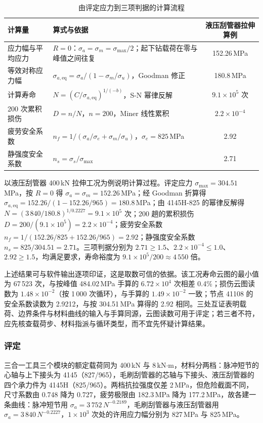 \begin{table}[htbp]
\centering
\caption{由评定应力到三项判据的计算流程}
\label{tab:fatigue-chain}
\small
\begin{tabularx}{\textwidth}{@{}lXc@{}}
\hline
计算量 & 算式与依据 & 液压刮管器拉伸算例 \\
\hline
应力幅与平均应力 & $R=0$：$\sigma_a=\sigma_m=\sigma_{\max}/2$；起下钻载荷在零与峰值之间往复 & 152.26\,MPa \\
等效对称应力幅 & $\sigma_{a,\mathrm{eq}}=\sigma_a/(1-\sigma_m/\sigma_u)$，Goodman 修正 & 180.8\,MPa \\
计算寿命 & $N=(C/\sigma_{a,\mathrm{eq}})^{1/(-b)}$，S-N 幂律反解 & $9.1\times10^{5}$ 次 \\
200 次累积损伤 & $D=n/N$，$n=200$，Miner 线性累积 & $2.2\times10^{-4}$ \\
疲劳安全系数 & $n_f=1/(\sigma_a/\sigma_e+\sigma_m/\sigma_u)$，$\sigma_e=825$\,MPa & 2.92 \\
静强度安全系数 & $n_s=\sigma_s/\sigma_{\max}$ & 2.71 \\
\hline
\end{tabularx}
\end{table}

以液压刮管器 400\,kN 拉伸工况为例说明计算过程。评定应力 $\sigma_{\max}=304.51$\,MPa，按 $R=0$ 得 $\sigma_a=\sigma_m=152.26$\,MPa；经 Goodman 折算得 $\sigma_{a,\mathrm{eq}}=152.26/(1-152.26/965)=180.8$\,MPa；由 4145H-825 的幂律反解得 $N=(3\,840/180.8)^{1/0.2227}=9.1\times10^{5}$ 次；200 趟的累积损伤 $D=200/(9.1\times10^{5})=2.2\times10^{-4}$；疲劳安全系数 $n_f=1/(152.26/825+152.26/965)=2.92$；静强度安全系数 $n_s=825/304.51=2.71$。三项判据分别为 $2.71\ge1.5$、$2.2\times10^{-4}\le1.0$、$2.92\ge1.5$，均满足要求，寿命裕度为 $9.1\times10^{5}/200\approx4\,550$ 倍。

上述结果可与软件输出逐项印证，这是取数可信的依据。该工况寿命云图的最小值为 67\,523 次，与按峰值 484.02\,MPa 手算的 $6.72\times10^{4}$ 次相差 0.4\%；损伤云图读数为 $1.48\times10^{-2}$（按 1\,000 次循环），与手算的 $1.49\times10^{-2}$ 一致；节点 41108 的安全系数读数为 2.9212，与按 304.51\,MPa 算得的 2.92 相同。三处互证表明载荷、边界条件与材料曲线的输入与手算同源，云图读数可用于评定；若三者不符，应先核查载荷步、材料指派与循环类型，而不宜先怀疑计算结果。

\subsubsection{评定}

三合一工具三个模块的额定载荷同为 400\,kN 与 8\,kN$\cdot$m，材料分两档：脉冲短节的心轴与上下接头为 4145（827/965），毛刷刮管器的芯轴与下接头、液压刮管器的四个承力件为 4145H（825/965）。两档抗拉强度仅差 2\,MPa，但危险截面不同，尺寸系数由 0.748 降为 0.727，疲劳极限由 182.3\,MPa 降为 177.2\,MPa，故各建一条曲线：脉冲短节用 $\sigma_a=3\,752\,N^{-0.2189}$，毛刷刮管器与液压刮管器用 $\sigma_a=3\,840\,N^{-0.2227}$，$1\times10^{3}$ 次处的许用应力幅分别为 827\,MPa 与 825\,MPa。

